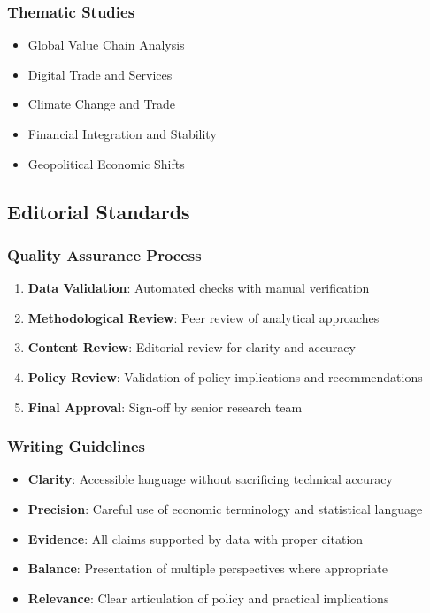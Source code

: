 \documentclass[11pt,a4paper]{article}
\begin{document}
\subsubsection{Thematic Studies}
\begin{itemize}
    \item Global Value Chain Analysis
    \item Digital Trade and Services
    \item Climate Change and Trade
    \item Financial Integration and Stability
    \item Geopolitical Economic Shifts
\end{itemize}

\subsection{Editorial Standards}

\subsubsection{Quality Assurance Process}
\begin{enumerate}
    \item \textbf{Data Validation}: Automated checks with manual verification
    \item \textbf{Methodological Review}: Peer review of analytical approaches
    \item \textbf{Content Review}: Editorial review for clarity and accuracy
    \item \textbf{Policy Review}: Validation of policy implications and recommendations
    \item \textbf{Final Approval}: Sign-off by senior research team
\end{enumerate}

\subsubsection{Writing Guidelines}
\begin{itemize}
    \item \textbf{Clarity}: Accessible language without sacrificing technical accuracy
    \item \textbf{Precision}: Careful use of economic terminology and statistical language
    \item \textbf{Evidence}: All claims supported by data with proper citation
    \item \textbf{Balance}: Presentation of multiple perspectives where appropriate
    \item \textbf{Relevance}: Clear articulation of policy and practical implications
\end{itemize}
\end{document}
